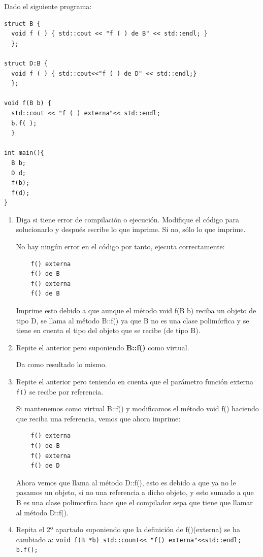  Dado el siguiente programa:
\begin{center}
  \begin{lstlisting}[frame = single]
struct B {
  void f ( ) { std::cout << "f ( ) de B" << std::endl; }
  };

struct D:B {
  void f ( ) { std::cout<<"f ( ) de D" << std::endl;}
  };

void f(B b) {
  std::cout << "f ( ) externa"<< std::endl;
  b.f( );
  }

int main(){
  B b;
  D d;
  f(b);
  f(d);
}
  \end{lstlisting}
\end{center}

\begin{enumerate}[label = \alph*)]
  \item Diga si tiene error de compilación o ejecución. Modifique el código para solucionarlo y después escribe lo que imprime. Si no, sólo lo que imprime.
  
  No hay ningún error en el código por tanto, ejecuta correctamente:
  \begin{verbatim}
    f() externa
    f() de B
    f() externa
    f() de B
  \end{verbatim}
  Imprime esto debido a que aunque el método void f(B b) reciba un objeto de tipo D, se llama al método B::f() ya que B no es una clase polimórfica y se tiene en cuenta el tipo del objeto que se recibe (de tipo B).
  \item Repite el anterior pero suponiendo \textbf{B::f()} como virtual.
  
  Da como resultado lo mismo.

  \item Repite el anterior pero teniendo en cuenta que el parámetro función externa \texttt{f()} se recibe por referencia.
  
  Si mantenemos como virtual B::f() y modificamos el método void f() haciendo que reciba una referencia, vemos que ahora imprime:

  \begin{verbatim}
    f() externa
    f() de B
    f() externa
    f() de D
  \end{verbatim}
  Ahora vemos que llama al método D::f(), esto es debido a que ya no le pasamos un objeto, si no una referencia a dicho objeto, y esto sumado a que B es una clase polimorfica hace que el compilador sepa que tiene que llamar al método D::f().
  \item Repita el 2º apartado suponiendo que la definición de f()(externa) se ha cambiado a: \texttt{void f(B *b) {std::count<< "f() externa"<<std::endl;
  b.f(); }}


\end{enumerate}
